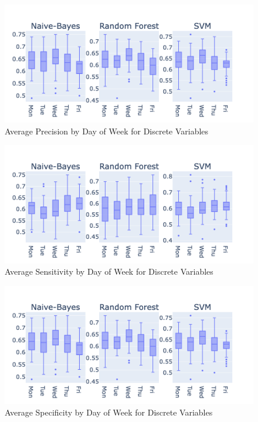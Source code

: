 \documentclass[aodsor,preprint]{imsart}
\numberwithin{equation}{section}
\theoremstyle{plain}
\begin{document}





\begin{figure}[H]
  \centering
  \includegraphics[width=\textwidth]{plots/precision.png}
  \caption{Average Precision by Day of Week for Discrete Variables}
  \label{fig:plot5}
\end{figure}

\begin{figure}[H]
  \centering
  \includegraphics[width=\textwidth]{plots/sensitivity.png}
  \caption{Average Sensitivity by Day of Week for Discrete Variables}
  \label{fig:plot6}
\end{figure}

\begin{figure}[H]
  \centering
  \includegraphics[width=\textwidth]{plots/specificity.png}
  \caption{Average Specificity by Day of Week for Discrete Variables}
  \label{fig:plot7}
\end{figure}
\end{document}
